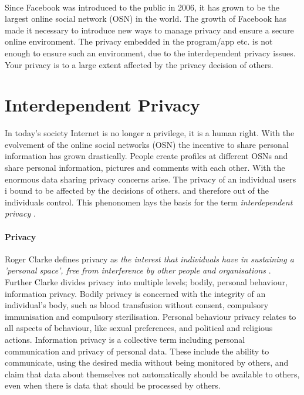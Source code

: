 \paragraph{}
Since Facebook was introduced to the public in 2006, it has grown to be the largest online social network (OSN) in the world. The growth of Facebook has made it necessary to introduce new ways to manage privacy and ensure a secure online environment. The privacy embedded in the program/app etc. is not enough to ensure such an environment, due to the interdependent privacy issues. Your privacy is to a large extent affected by the privacy decision of others. 

\section{Interdependent Privacy}
In today's society Internet is no longer a privilege, it is a human right. With the evolvement of the online social networks (OSN) the incentive to share personal information has grown drastically. People create profiles at different OSNs and share personal information, pictures and comments with each other. With the enormous data sharing privacy concerns arise. The privacy of an individual users i bound to be affected by the decisions of others. and therefore out of the individuals control. This phenonomen lays the basis for the term \textit{interdependent privacy} \cite{InterdependetPriv}. 

\paragraph{Privacy}
Roger Clarke defines privacy as \textit{the interest that individuals have in sustaining a 'personal space', free from interference by other people and organisations} \cite{privacy}. Further Clarke divides privacy into multiple levels; bodily, personal behaviour, information privacy. Bodily privacy is concerned with the integrity of an individual's body, such as blood transfusion without consent, compulsory immunisation and compulsory sterilisation. Personal behaviour privacy relates to all aspects of behaviour, like sexual preferences, and political and religious actions. Information privacy is a collective term including personal communication and privacy of personal data. These include the ability to communicate, using the desired media without being monitored by others, and claim that data about themselves not automatically should be available to others, even when there is data that should be processed by others.


